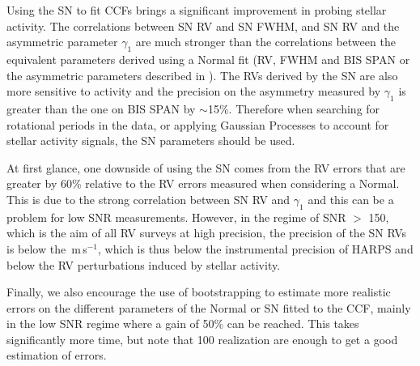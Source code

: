 \documentclass[11pt, oneside]{article}
\def\ms{\hbox{\,m\,s$^{-1}$}}         %
\begin{document}
Using the SN to fit CCFs brings a significant improvement in probing stellar activity. The correlations between SN RV and SN FWHM, and SN RV and the asymmetric parameter $\gamma_1$ are much stronger than the correlations between the equivalent parameters derived using a Normal fit (RV, FWHM and BIS SPAN or the asymmetric parameters described in \citet{Figueira-2013}). The RVs derived by the SN are also more sensitive to activity and the precision on the asymmetry measured by $\gamma_1$ is greater than the one on BIS SPAN by $\sim$15\%. Therefore when searching for rotational periods in the data, or applying Gaussian Processes to account for stellar activity signals, the SN parameters should be used.

At first glance, one downside of using the SN comes from the RV errors that are greater by 60\% relative to the RV errors measured when considering a Normal. This is due to the strong correlation between SN RV and $\gamma_1$ and this can be a problem for low SNR measurements. However, in the regime of SNR $>$ 150, which is the aim of all RV surveys at high precision, the precision of the SN RVs is below the \ms, which is thus below the instrumental precision of HARPS and below the RV perturbations induced by stellar activity.

Finally, we also encourage the use of bootstrapping to estimate more realistic errors on the different parameters of the Normal or SN fitted to the CCF, mainly in the low SNR regime where a gain of 50\% can be reached. This takes significantly more time, but note that 100 realization are enough to get a good estimation of errors.


\end{document}
